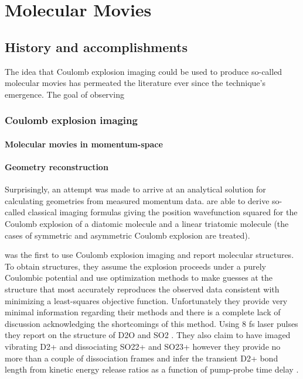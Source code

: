 \chapter{Molecular Movies}\label{ch:MolecularMovies}

\section{History and accomplishments}
The idea that Coulomb explosion imaging could be used to produce so-called molecular movies has permeated the literature ever since the technique's emergence. The goal of observing 

\subsection{Coulomb explosion imaging}

\subsubsection{Molecular movies in momentum-space}

\subsubsection{Geometry reconstruction}
Surprisingly, an attempt was made to arrive at an analytical solution for calculating geometries from measured momentum data. \citet{Nagaya04}  are able to derive so-called classical imaging formulas giving the position wavefunction squared for the Coulomb explosion of a diatomic molecule and a linear triatomic molecule (the cases of symmetric and asymmetric Coulomb explosion are treated).

\citet{Legare05structure,Legare05dynamics} was the first to use Coulomb explosion imaging and report molecular structures. To obtain structures, they assume the explosion proceeds under a purely Coulombic potential and use optimization methods to make guesses at the structure that most accurately reproduces the observed data consistent with minimizing a least-squares objective function. Unfortunately they provide very minimal information regarding their methods and there is a complete lack of discussion acknowledging the shortcomings of this method. Using 8 fs laser pulses they report on the structure of D2O and SO2 \citep{Legare05structure}. They also claim to have imaged vibrating D2+ and dissociating SO22+ and SO23+ however they provide no more than a couple of dissociation frames and infer the transient D2+ bond length from kinetic energy release ratios as a function of pump-probe time delay \citep{Legare05dynamics}.

